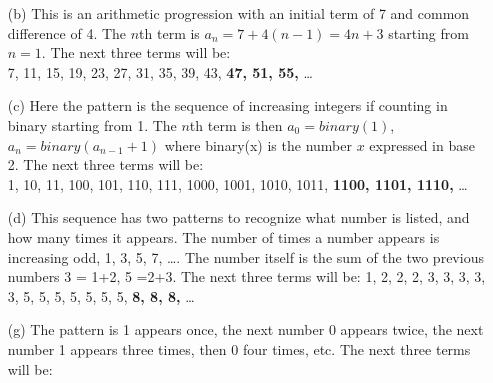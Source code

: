 \documentclass[12pt,addpoints]{exam}
\begin{document}
\begin{questions}
\begin{solution}
\begin{itemize}[topsep=0pt,parsep=0pt,itemsep=0pt]
    \item[(b)] This is an arithmetic progression with an initial term of 7 and common difference of 4.  The $n$th term is $a_n = 7 + 4(n-1) = 4n + 3$ starting from $n=1$.  The next three terms will be: \\
    7, 11, 15, 19, 23, 27, 31, 35, 39, 43, \textbf{47, 51, 55,} \ldots
 	\item[(c)] Here the pattern is the sequence of increasing integers if counting in binary starting from 1. The $n$th term is then $a_0 = binary(1)$, $a_n = binary(a_{n-1}+1)$ where binary(x) is the number $x$ expressed in base 2.  The next three terms will be: \\
    1, 10, 11, 100, 101, 110, 111, 1000, 1001, 1010, 1011, \textbf{1100, 1101, 1110,} \ldots
    \item[(d)] This sequence has two patterns to recognize what number is listed, and how many times it appears.  The number of times a number appears is increasing odd, 1, 3, 5, 7, \ldots.  The number itself is the sum of the two previous numbers 3 = 1+2, 5 =2+3.   The next three terms will be:
    1, 2, 2, 2, 3, 3, 3, 3, 3, 5, 5, 5, 5, 5, 5, 5, \textbf{8, 8, 8,} \ldots
    \item[(g)] The pattern is 1 appears once, the next number 0 appears twice, the next number 1 appears three times, then 0 four times, etc.  The next three terms will be: \\

\end{itemize}
\end{solution}
\end{questions}
\end{document}
